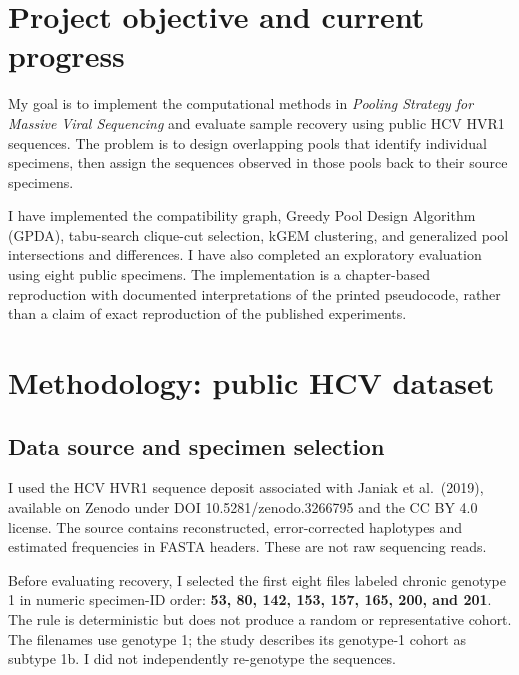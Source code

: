 \hypertarget{project-objective-and-current-progress}{%
\section{Project objective and current
progress}\label{project-objective-and-current-progress}}

My goal is to implement the computational methods in \emph{Pooling
Strategy for Massive Viral Sequencing} and evaluate sample recovery
using public HCV HVR1 sequences. The problem is to design overlapping
pools that identify individual specimens, then assign the sequences
observed in those pools back to their source specimens.

I have implemented the compatibility graph, Greedy Pool Design Algorithm
(GPDA), tabu-search clique-cut selection, kGEM clustering, and
generalized pool intersections and differences. I have also completed an
exploratory evaluation using eight public specimens. The implementation
is a chapter-based reproduction with documented interpretations of the
printed pseudocode, rather than a claim of exact reproduction of the
published experiments.

\hypertarget{methodology-public-hcv-dataset}{%
\section{Methodology: public HCV
dataset}\label{methodology-public-hcv-dataset}}

\hypertarget{data-source-and-specimen-selection}{%
\subsection{Data source and specimen
selection}\label{data-source-and-specimen-selection}}

I used the HCV HVR1 sequence deposit associated with Janiak et
al.~(2019), available on Zenodo under DOI 10.5281/zenodo.3266795 and the
CC BY 4.0 license. The source contains reconstructed, error-corrected
haplotypes and estimated frequencies in FASTA headers. These are not raw
sequencing reads.

Before evaluating recovery, I selected the first eight files labeled
chronic genotype 1 in numeric specimen-ID order: \textbf{53, 80, 142,
153, 157, 165, 200, and 201}. The rule is deterministic but does not
produce a random or representative cohort. The filenames use genotype 1;
the study describes its genotype-1 cohort as subtype 1b. I did not
independently re-genotype the sequences.

